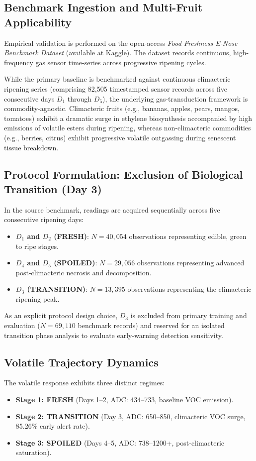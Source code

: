 \documentclass[conference]{IEEEtran}
\begin{document}
\subsection{Benchmark Ingestion and Multi-Fruit Applicability}
Empirical validation is performed on the open-access \textit{Food Freshness E-Nose Benchmark Dataset} \cite{dawoud2023} (available at Kaggle). The dataset records continuous, high-frequency gas sensor time-series across progressive ripening cycles. 

While the primary baseline is benchmarked against continuous climacteric ripening series (comprising 82,505 timestamped sensor records across five consecutive days $D_1$ through $D_5$), the underlying gas-transduction framework is commodity-agnostic. Climacteric fruits (e.g., bananas, apples, pears, mangos, tomatoes) exhibit a dramatic surge in ethylene biosynthesis accompanied by high emissions of volatile esters during ripening, whereas non-climacteric commodities (e.g., berries, citrus) exhibit progressive volatile outgassing during senescent tissue breakdown.

\subsection{Protocol Formulation: Exclusion of Biological Transition (Day 3)}
In the source benchmark, readings are acquired sequentially across five consecutive ripening days:
\begin{itemize}
    \item \textbf{$D_1$ and $D_2$ (FRESH)}: $N = 40,054$ observations representing edible, green to ripe stages.
    \item \textbf{$D_4$ and $D_5$ (SPOILED)}: $N = 29,056$ observations representing advanced post-climacteric necrosis and decomposition.
    \item \textbf{$D_3$ (TRANSITION)}: $N = 13,395$ observations representing the climacteric ripening peak.
\end{itemize}
As an explicit protocol design choice, $D_3$ is excluded from primary training and evaluation ($N = 69,110$ benchmark records) and reserved for an isolated transition phase analysis to evaluate early-warning detection sensitivity.

\subsection{Volatile Trajectory Dynamics}
The volatile response exhibits three distinct regimes:
\begin{itemize}
    \item \textbf{Stage 1: FRESH} (Days 1--2, ADC: 434--733, baseline VOC emission).
    \item \textbf{Stage 2: TRANSITION} (Day 3, ADC: 650--850, climacteric VOC surge, 85.26\% early alert rate).
    \item \textbf{Stage 3: SPOILED} (Days 4--5, ADC: 738--1200+, post-climacteric saturation).
\end{itemize}
\end{document}
